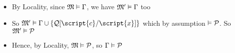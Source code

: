 \begin{frame}
\begin{itemize}[<+->]
\item By Locality, since $\mathfrak{M} \vDash \Gamma$, we have $\mathfrak{M}' \vDash \Gamma$ too 

\item So $\mathfrak{M}' \entails \Gamma \cup \{ \metav{Q}\substitute{\script{x}}{\script{c}} \}$ which by assumption $ \vDash \mathcal{P}$. So $\mathfrak{M}' \vDash \mathcal{P}$

\item Hence, by Locality, $\mathfrak{M} \vDash \mathcal{P}$, so $\Gamma \vDash \mathcal{P}$





\end{itemize}
\end{frame}





